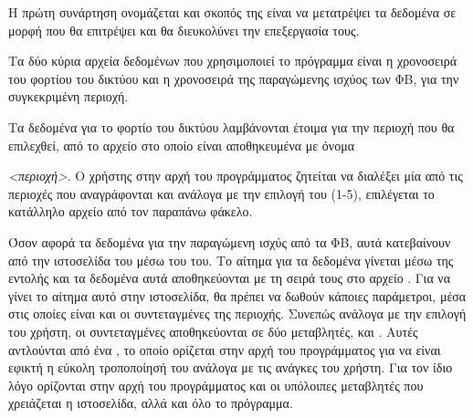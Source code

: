 \documentclass[12pt]{report}
\begin{document}
Η πρώτη συνάρτηση ονομάζεται {} και σκοπός της είναι να μετατρέψει τα δεδομένα
σε μορφή που θα επιτρέψει και θα διευκολύνει την επεξεργασία τους.

Τα δύο κύρια αρχεία δεδομένων που χρησιμοποιεί το πρόγραμμα είναι η χρονοσειρά του φορτίου του δικτύου και η 
χρονοσειρά της παραγώμενης ισχύος των ΦΒ, για την συγκεκριμένη περιοχή. 

Τα δεδομένα για το φορτίο του δικτύου λαμβάνονται έτοιμα για την περιοχή που θα επιλεχθεί, από το αρχείο στο οποίο
είναι αποθηκευμένα με όνομα {{}\textit{<περιοχή>}{}. 
Ο χρήστης στην αρχή του προγράμματος ζητείται να διαλέξει μία από τις περιοχές που αναγράφονται και ανάλογα με την
επιλογή του (1-5), επιλέγεται το κατάλληλο αρχείο από τον παραπάνω φάκελο.

{}

Όσον αφορά τα δεδομένα για την παραγώμενη ισχύς από τα ΦΒ, αυτά κατεβαίνουν από την ιστοσελίδα του 
{} μέσω του {} του. Το αίτημα για τα δεδομένα γίνεται 
μέσω της εντολής {} και τα δεδομένα αυτά αποθηκεύονται με τη σειρά τους στο αρχείο {}.
Για να γίνει το αίτημα αυτό στην ιστοσελίδα, θα πρέπει να δωθούν κάποιες παράμετροι, μέσα στις οποίες είναι και οι 
συντεταγμένες της περιοχής. Συνεπώς ανάλογα με την επιλογή του χρήστη, οι συντεταγμένες αποθηκεύονται σε δύο 
μεταβλητές, {} και {}. Αυτές αντλούνται από ένα {}, το οποίο
ορίζεται στην αρχή του προγράμματος για να είναι εφικτή η εύκολη τροποποίησή του ανάλογα με τις ανάγκες του χρήστη.
Για τον ίδιο λόγο ορίζονται στην αρχή του προγράμματος και οι υπόλοιπες μεταβλητές που χρειάζεται η ιστοσελίδα, 
αλλά και όλο το πρόγραμμα.

{}

}
\end{document}
